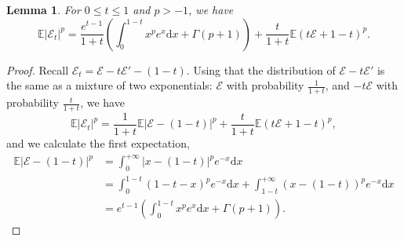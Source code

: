 \documentclass[10pt]{amsart}
\newcommand{\dd}{\mathrm{d}}
\newcommand{\E}{\mathbb{E}}
\newcommand{\1}{\textbf{1}}
\newcommand{\cE}{\mathcal{E}}
\newtheorem{lemma}[theorem]{Lemma}
\theoremstyle{remark}
\theoremstyle{definition}
\begin{document}
\begin{lemma}\label{lm:Lp-explicit}
For $0 \leq t \leq 1$ and $p > -1$, we have
\[ 
\E|\cE_t|^p = \frac{e^{t-1}}{1+t}\left(\int_0^{1-t} x^{p}e^x \dd x + \Gamma(p+1)\right) +  \frac{t}{1+t}\E(t\cE + 1-t)^{p}.
 \]
\end{lemma}
\begin{proof}
Recall $\cE_t = \cE-t\cE'-(1-t)$. Using that the distribution of $\cE-t\cE'$ is the same as a mixture of two exponentials: $\cE$ with probability $\frac{1}{1+t}$, and $-t\cE$ with probability $\frac{t}{1+t}$, we have
\[ 
\E|\cE_t|^{p} = \frac{1}{1+t}\E|\cE - (1-t)|^{p} + \frac{t}{1+t}\E(t\cE + 1-t)^{p},
 \]
and we calculate the first expectation,
\begin{align*}
\E|\cE - (1-t)|^{p} &= \int_0^{+\infty} |x - (1-t)|^{p} e^{-x} \dd x \\
&= \int_0^{1-t} (1-t-x)^{p}e^{-x}\dd x + \int_{1-t}^{+\infty} (x-(1-t))^{p} e^{-x}\dd x \\
&= e^{t-1}\left(\int_0^{1-t} x^{p}e^x \dd x + \Gamma(p+1)\right).
\end{align*}
\end{proof}
\end{document}
